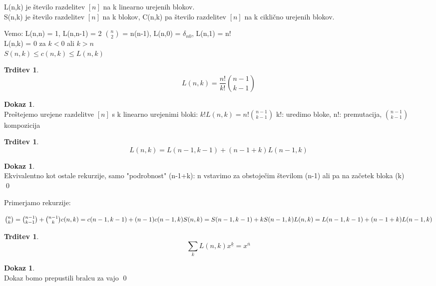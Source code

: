 \documentclass[a4paper,12pt]{article}
\theoremstyle{definition}
\newtheorem{claim}[counter]{Trditev}
\newtheorem{pro}[counter]{Dokaz}
\theoremstyle{remark}
\begin{document}
L(n,k) je število razdelitev $[n]$ na k linearno urejenih blokov. \\
S(n,k) je število razdelitev $[n]$ na k blokov, C(n,k) pa število razdelitev $[n]$ na
    k ciklično urejenih blokov.

Vemo: L(n,n) = 1, L(n,n-1) = 2 $\binom{n}{2}$ = n(n-1), L(n,0) = $\delta_{n0}$, L(n,1) = n! \\
L(n,k) = 0 za $k < 0$ ali $k > n$ \\
$S(n,k) \leq c(n,k) \leq L(n,k)$ \\

\begin{claim}
    \[L(n,k) = \frac{n!}{k!} \binom{n-1}{k-1}\]
\end{claim}

\begin{pro}\mbox{} \\
    Preštejemo urejene razdelitve $[n]$ s k linearno urejenimi bloki: $k! L(n,k) = n! \binom{n-1}{k-1}$
    k!: uredimo bloke, n!: premutacija, $\binom{n-1}{k-1}$ kompozicija
\end{pro}

\begin{claim}
    \[L(n,k) = L(n-1, k-1) + (n-1+k) L(n-1, k)\]
\end{claim}

\begin{pro}\mbox{}\\
    Ekvivalentno kot ostale rekurzije, samo "podrobnost" (n-1+k): n vstavimo za obstoječim
    številom (n-1) ali pa na začetek bloka (k) \\
    \qed
\end{pro}

Primerjamo rekurzije:

\begin{math}
    \binom{n}{k} = \binom{n-1}{k-1} + \binom{n-1}{k} \\
    c(n,k) = c(n-1, k-1) + (n-1) c(n-1, k) \\
    S(n,k) = S(n-1, k-1) + k S(n-1, k) \\
    L(n,k) = L(n-1, k-1) + (n-1+k) L(n-1, k)
\end{math}

\begin{claim}
    \[ \sum_k L(n,k)x^{\underline{k}} = x^{\overline{n}}\]
\end{claim}

\begin{pro}\mbox{}\\
    Dokaz bomo prepustili bralcu za vajo
    \qed
\end{pro}
\end{document}
